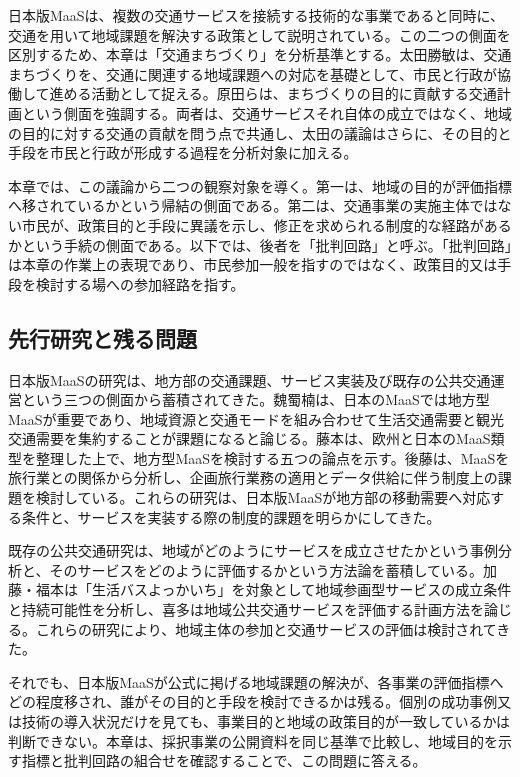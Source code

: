 日本版MaaSは、複数の交通サービスを接続する技術的な事業であると同時に、交通を用いて地域課題を解決する政策として説明されている。この二つの側面を区別するため、本章は「交通まちづくり」を分析基準とする。太田勝敏は、交通まちづくりを、交通に関連する地域課題への対応を基礎として、市民と行政が協働して進める活動として捉える\cite{otakatsutoshi2008machizukuri}。原田らは、まちづくりの目的に貢献する交通計画という側面を強調する\cite{harada2015machizukuri}。両者は、交通サービスそれ自体の成立ではなく、地域の目的に対する交通の貢献を問う点で共通し、太田の議論はさらに、その目的と手段を市民と行政が形成する過程を分析対象に加える。

本章では、この議論から二つの観察対象を導く。第一は、地域の目的が評価指標へ移されているかという帰結の側面である。第二は、交通事業の実施主体ではない市民が、政策目的と手段に異議を示し、修正を求められる制度的な経路があるかという手続の側面である。以下では、後者を「批判回路」と呼ぶ。「批判回路」は本章の作業上の表現であり、市民参加一般を指すのではなく、政策目的又は手段を検討する場への参加経路を指す。

\subsection{先行研究と残る問題}

日本版MaaSの研究は、地方部の交通課題、サービス実装及び既存の公共交通運営という三つの側面から蓄積されてきた。魏蜀楠は、日本のMaaSでは地方型MaaSが重要であり、地域資源と交通モードを組み合わせて生活交通需要と観光交通需要を集約することが課題になると論じる\cite{weishunan2022}。藤本は、欧州と日本のMaaS類型を整理した上で、地方型MaaSを検討する五つの論点を示す\cite{fujimoto2021}。後藤は、MaaSを旅行業との関係から分析し、企画旅行業務の適用とデータ供給に伴う制度上の課題を検討している\cite{gotodai2021}。これらの研究は、日本版MaaSが地方部の移動需要へ対応する条件と、サービスを実装する際の制度的課題を明らかにしてきた。

既存の公共交通研究は、地域がどのようにサービスを成立させたかという事例分析と、そのサービスをどのように評価するかという方法論を蓄積している。加藤・福本は「生活バスよっかいち」を対象として地域参画型サービスの成立条件と持続可能性を分析し\cite{kato2009transport}、喜多は地域公共交通サービスを評価する計画方法を論じる\cite{kita2022}。これらの研究により、地域主体の参加と交通サービスの評価は検討されてきた。

それでも、日本版MaaSが公式に掲げる地域課題の解決が、各事業の評価指標へどの程度移され、誰がその目的と手段を検討できるかは残る。個別の成功事例又は技術の導入状況だけを見ても、事業目的と地域の政策目的が一致しているかは判断できない。本章は、採択事業の公開資料を同じ基準で比較し、地域目的を示す指標と批判回路の組合せを確認することで、この問題に答える。

